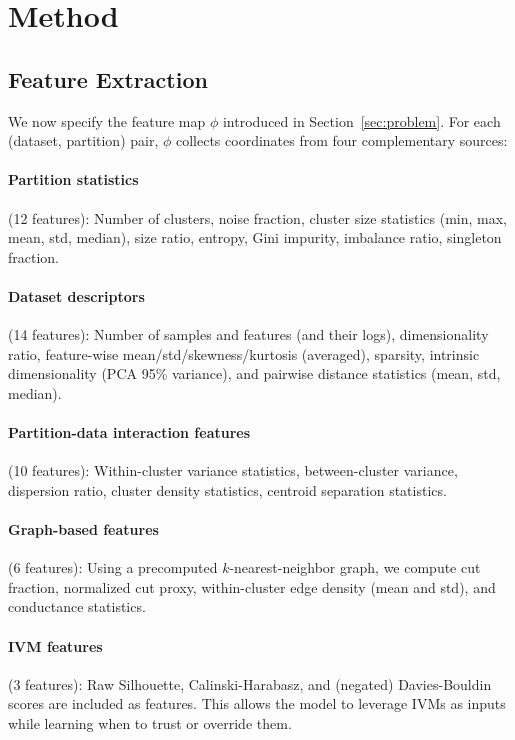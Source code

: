 \documentclass[10pt]{article} %
\begin{document}
\section{Method}
\label{sec:method}

\subsection{Feature Extraction}
\label{sec:features}

We now specify the feature map $\phi$ introduced in Section~\ref{sec:problem}. For each (dataset, partition) pair, $\phi$ collects coordinates from four complementary sources:

\paragraph{Partition statistics} (12 features): Number of clusters, noise fraction, cluster size statistics (min, max, mean, std, median), size ratio, entropy, Gini impurity, imbalance ratio, singleton fraction.

\paragraph{Dataset descriptors} (14 features): Number of samples and features (and their logs), dimensionality ratio, feature-wise mean/std/skewness/kurtosis (averaged), sparsity, intrinsic dimensionality (PCA 95\% variance), and pairwise distance statistics (mean, std, median).

\paragraph{Partition-data interaction features} (10 features): Within-cluster variance statistics, between-cluster variance, dispersion ratio, cluster density statistics, centroid separation statistics.

\paragraph{Graph-based features} (6 features): Using a precomputed $k$-nearest-neighbor graph, we compute cut fraction, normalized cut proxy, within-cluster edge density (mean and std), and conductance statistics.

\paragraph{IVM features} (3 features): Raw Silhouette, Calinski-Harabasz, and (negated) Davies-Bouldin scores are included as features. This allows the model to leverage IVMs as inputs while learning when to trust or override them.
\end{document}
